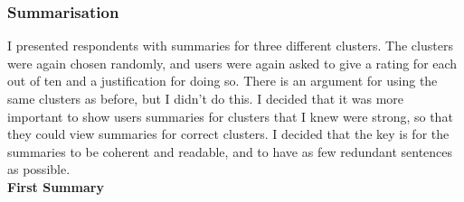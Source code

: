 \documentclass[12pt]{article}
\begin{document}
\subsubsection{Summarisation}

I presented respondents with summaries for three different clusters. The clusters were again chosen randomly, and users were again asked to give a rating for each out of ten and a justification for doing so. There is an argument for using the same clusters as before, but I didn't do this. I decided that it was more important to show users summaries for clusters that I knew were strong, so that they could view summaries for correct clusters. I decided that the key is for the summaries to be coherent and readable, and to have as few redundant sentences as possible. \\

\textbf{First Summary}
\end{document}

